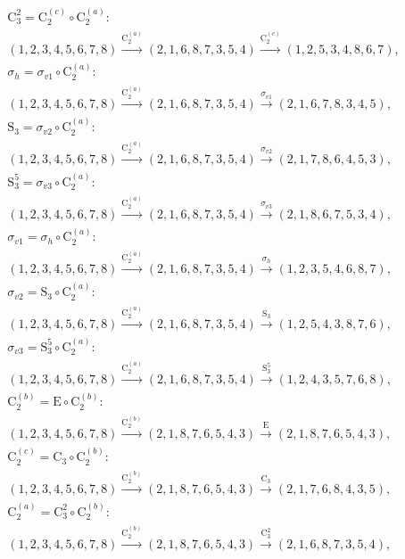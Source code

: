 \begin{align*}
& \mathrm{C}_{3}^{2} = \mathrm{C}_{2}^{(c)} \circ \mathrm{C}_{2}^{(a)}:\; \\& (1,2,3,4,5,6,7,8) \xrightarrow{\mathrm{C}_{2}^{(a)}} (2,1,6,8,7,3,5,4) \xrightarrow{\mathrm{C}_{2}^{(c)}} (1,2,5,3,4,8,6,7), \\
& \sigma_{h} = \sigma_{v1} \circ \mathrm{C}_{2}^{(a)}:\; \\& (1,2,3,4,5,6,7,8) \xrightarrow{\mathrm{C}_{2}^{(a)}} (2,1,6,8,7,3,5,4) \xrightarrow{\sigma_{v1}} (2,1,6,7,8,3,4,5), \\
& \mathrm{S}_{3} = \sigma_{v2} \circ \mathrm{C}_{2}^{(a)}:\; \\& (1,2,3,4,5,6,7,8) \xrightarrow{\mathrm{C}_{2}^{(a)}} (2,1,6,8,7,3,5,4) \xrightarrow{\sigma_{v2}} (2,1,7,8,6,4,5,3), \\
& \mathrm{S}_{3}^{5} = \sigma_{v3} \circ \mathrm{C}_{2}^{(a)}:\; \\& (1,2,3,4,5,6,7,8) \xrightarrow{\mathrm{C}_{2}^{(a)}} (2,1,6,8,7,3,5,4) \xrightarrow{\sigma_{v3}} (2,1,8,6,7,5,3,4), \\
& \sigma_{v1} = \sigma_{h} \circ \mathrm{C}_{2}^{(a)}:\; \\& (1,2,3,4,5,6,7,8) \xrightarrow{\mathrm{C}_{2}^{(a)}} (2,1,6,8,7,3,5,4) \xrightarrow{\sigma_{h}} (1,2,3,5,4,6,8,7), \\
& \sigma_{v2} = \mathrm{S}_{3} \circ \mathrm{C}_{2}^{(a)}:\; \\& (1,2,3,4,5,6,7,8) \xrightarrow{\mathrm{C}_{2}^{(a)}} (2,1,6,8,7,3,5,4) \xrightarrow{\mathrm{S}_{3}} (1,2,5,4,3,8,7,6), \\
& \sigma_{v3} = \mathrm{S}_{3}^{5} \circ \mathrm{C}_{2}^{(a)}:\; \\& (1,2,3,4,5,6,7,8) \xrightarrow{\mathrm{C}_{2}^{(a)}} (2,1,6,8,7,3,5,4) \xrightarrow{\mathrm{S}_{3}^{5}} (1,2,4,3,5,7,6,8), \\
& \mathrm{C}_{2}^{(b)} = \mathrm{E} \circ \mathrm{C}_{2}^{(b)}:\; \\& (1,2,3,4,5,6,7,8) \xrightarrow{\mathrm{C}_{2}^{(b)}} (2,1,8,7,6,5,4,3) \xrightarrow{\mathrm{E}} (2,1,8,7,6,5,4,3), \\
& \mathrm{C}_{2}^{(c)} = \mathrm{C}_{3} \circ \mathrm{C}_{2}^{(b)}:\; \\& (1,2,3,4,5,6,7,8) \xrightarrow{\mathrm{C}_{2}^{(b)}} (2,1,8,7,6,5,4,3) \xrightarrow{\mathrm{C}_{3}} (2,1,7,6,8,4,3,5), \\
& \mathrm{C}_{2}^{(a)} = \mathrm{C}_{3}^{2} \circ \mathrm{C}_{2}^{(b)}:\; \\& (1,2,3,4,5,6,7,8) \xrightarrow{\mathrm{C}_{2}^{(b)}} (2,1,8,7,6,5,4,3) \xrightarrow{\mathrm{C}_{3}^{2}} (2,1,6,8,7,3,5,4), \\

\end{align*}
